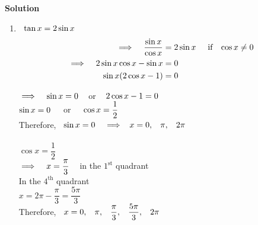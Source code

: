 \documentclass[11pt,a4paper]{article}
\begin{document}
\textbf{Solution}
\begin{enumerate}
\item[i.] $\hspace{0.2cm} \tan x = 2\sin x$
\begin{align*}
\implies \hspace{0.3cm} \dfrac{\sin x }{\cos x} & = 2\sin x\hspace{0.5cm} \text{if}\hspace{0.3cm} \cos x \neq 0\\
\implies \hspace{0.3cm} 2\sin x\cos x - \sin x &  = 0\\
\sin x ( 2\cos x - 1 ) & = 0
\end{align*}

$\implies\hspace{0.3cm} \sin x = 0\hspace{0.3cm}$ or $\hspace{0.3cm} 2\cos x - 1 = 0$\\

$\sin x = 0\hspace{0.4cm}$  or $\hspace{0.4cm} \cos x = \dfrac{1}{2}$\\

Therefore, $\hspace{0.2cm} \sin x = 0 \hspace{0.3cm}\implies\hspace{0.2cm} x = 0, \hspace{0.3cm} \pi, \hspace{0.3cm} 2\pi$\\\\

$\cos x = \dfrac{1}{2}$\\
$\implies \hspace{0.3cm} x = \dfrac{\pi}{3}\hspace{0.3cm}$ in the $1^{\text{st}}$ quadrant\\

In the $4^{\text{th}}$ quadrant\\
$x = 2\pi - \dfrac{\pi}{3} = \dfrac{5\pi}{3}$\\


Therefore, $\hspace{0.2cm} x = 0, \hspace{0.3cm} \pi, \hspace{0.3cm} \dfrac{\pi}{3}, \hspace{0.3cm} \dfrac{5\pi}{3}, \hspace{0.3cm} 2\pi$\\\\\\






\end{enumerate}
\end{document}

